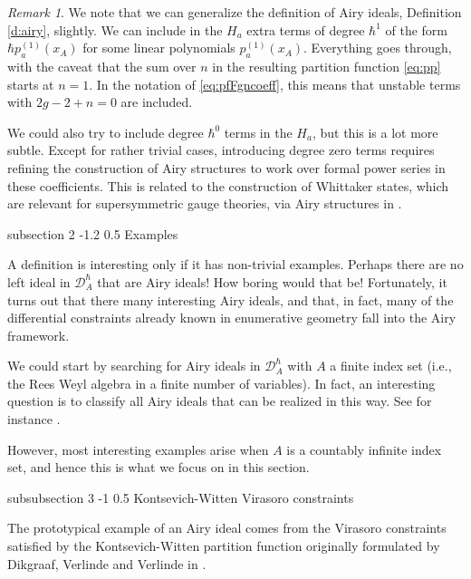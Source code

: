 \documentclass[reqno,oneside,11pt]{amsart}
\makeatletter
\theoremstyle{plain}
\theoremstyle{definition}
\theoremstyle{remark}
\newtheorem{remark}[theorem]{Remark}
\numberwithin{equation}{section}
\renewcommand{\subsection}{\@startsection
{subsection}%
{2}%
{\z@}%
{-1.2\baselineskip}%
{0.5\baselineskip}%
{\normalfont \bf \normalsize}} %
\renewcommand{\subsubsection}{\@startsection
{subsubsection}%
{3}%
{\z@}%
{-1\baselineskip}%
{0.5\baselineskip}%
{\normalfont \it \normalsize}} %
\newcommand{\DAh}{\mathcal{D}_A^{\hbar}}
\makeatother
\begin{document}
\begin{remark}
We note that we can generalize the definition of Airy ideals, Definition \ref{d:airy}, slightly. We can include in the $H_a$ extra terms of degree $\hbar^1$ of the form $\hbar p _a^{(1)}(x_A)$ for some linear polynomials $p_a^{(1)}(x_A)$. Everything goes through, with the caveat that the sum over $n$ in the resulting partition function \eqref{eq:pp} starts at $n=1$. In the notation of \eqref{eq:pfFgncoeff}, this means that unstable terms with $2g-2+n = 0$ are included.

We could also try to include degree $\hbar^0$ terms in the $H_a$, but this is a lot more subtle. Except for rather trivial cases, introducing degree zero terms requires refining the construction of Airy structures to work over formal power series in these coefficients. This is related to the construction of Whittaker states, which are relevant for supersymmetric gauge theories, via Airy structures in \cite{BBCC21,BCU24}.
\end{remark}

\subsection{Examples}

A definition is interesting only if it has non-trivial examples. Perhaps there are no left ideal in $\DAh$ that are Airy ideals! How boring would that be! Fortunately, it turns out that there many interesting Airy ideals, and that, in fact, many of the differential constraints already known in enumerative geometry fall into the Airy framework.

We could start by searching for Airy ideals in $\DAh$ with $A$ a finite index set (i.e., the Rees Weyl algebra in a finite number of variables). In fact, an interesting question is to classify all Airy ideals that can be realized in this way. See for instance \cite{ABCO17,HR19}.

However, most interesting examples arise when $A$ is a countably infinite index set, and hence this is what we focus on in this section.

\subsubsection{Kontsevich-Witten Virasoro constraints}
\label{s:KW}

The prototypical example of an Airy  ideal comes from the Virasoro constraints satisfied by the Kontsevich-Witten partition function originally formulated by Dikgraaf, Verlinde and Verlinde in \cite{DVV91}.
\end{document}
